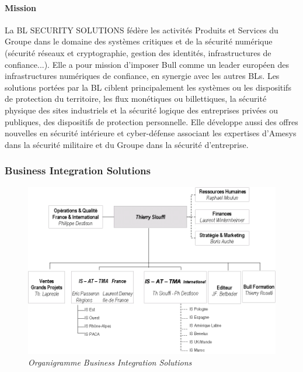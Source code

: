 \documentclass[11pt]{article}
\begin{document}
		\paragraph{Mission}
		La BL SECURITY SOLUTIONS fédère les activités Produits et Services du Groupe dans le domaine 
		des systèmes critiques et de la sécurité numérique (sécurité réseaux et cryptographie, gestion des 
		identités, infrastructures de confiance...). Elle a pour mission d'imposer Bull comme un leader 
		européen des infrastructures numériques de confiance, en synergie avec les autres BLs. \newline
		Les solutions portées par la BL ciblent principalement les systèmes ou les dispositifs de protection 
		du territoire, les flux monétiques ou billettiques, la sécurité physique des sites industriels et la 
		sécurité logique des entreprises privées ou publiques, des dispositifs de protection personnelle. \newline
		Elle développe aussi des offres nouvelles en sécurité intérieure et cyber-défense associant les 
		expertises d'Amesys dans la sécurité militaire et du Groupe dans la sécurité d'entreprise.
		\newpage
		\subsubsection{Business Integration Solutions}
		\begin{figure}[!h]
		\centering \includegraphics[scale=0.4]{orga_bussol.png}
		\caption{\it Organigramme Business Integration Solutions}
		\end{figure}
\end{document}
